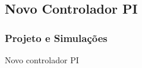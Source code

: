 \documentclass{beamer}
\begin{document}
\subsection{Novo Controlador PI}
\begin{frame}
	\frametitle{Projeto e Simulações}
	\begin{block}{Novo controlador PI}
		\begin{center}
			\begin{center}
			\end{center}
		\end{center}
	\end{block}
\end{frame}
\end{document}
